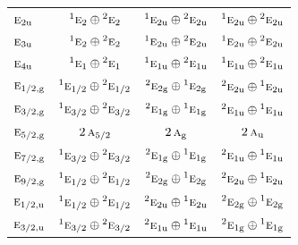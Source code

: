 \documentclass[10pt,a4paper]{article}
\numberwithin{equation}{section}
\newcommand{\irr}[1]{\text{\normalfont\scshape #1}}
\newcommand{\conjpair}[1]{{}^{#1}}
\newcommand{\ptag}[1]{\mathrm{#1}}
\begin{document}
{\begin{longtable}{@{}lccc@{}}
$\irr{e}_{2\ptag{u}}$ & $\conjpair{1}\irr{e}_{2}\oplus \conjpair{2}\irr{e}_{2}$ & $\conjpair{1}\irr{e}_{2\ptag{u}}\oplus \conjpair{2}\irr{e}_{2\ptag{u}}$ & $\conjpair{1}\irr{e}_{2\ptag{u}}\oplus \conjpair{2}\irr{e}_{2\ptag{u}}$\\
$\irr{e}_{3\ptag{u}}$ & $\conjpair{1}\irr{e}_{2}\oplus \conjpair{2}\irr{e}_{2}$ & $\conjpair{1}\irr{e}_{2\ptag{u}}\oplus \conjpair{2}\irr{e}_{2\ptag{u}}$ & $\conjpair{1}\irr{e}_{2\ptag{u}}\oplus \conjpair{2}\irr{e}_{2\ptag{u}}$\\
$\irr{e}_{4\ptag{u}}$ & $\conjpair{1}\irr{e}_{1}\oplus \conjpair{2}\irr{e}_{1}$ & $\conjpair{1}\irr{e}_{1\ptag{u}}\oplus \conjpair{2}\irr{e}_{1\ptag{u}}$ & $\conjpair{1}\irr{e}_{1\ptag{u}}\oplus \conjpair{2}\irr{e}_{1\ptag{u}}$\\
$\irr{e}_{1/2,\ptag{g}}$ & $\conjpair{1}\irr{e}_{1/2}\oplus \conjpair{2}\irr{e}_{1/2}$ & $\conjpair{2}\irr{e}_{2\ptag{g}}\oplus \conjpair{1}\irr{e}_{2\ptag{g}}$ & $\conjpair{2}\irr{e}_{2\ptag{u}}\oplus \conjpair{1}\irr{e}_{2\ptag{u}}$\\
$\irr{e}_{3/2,\ptag{g}}$ & $\conjpair{1}\irr{e}_{3/2}\oplus \conjpair{2}\irr{e}_{3/2}$ & $\conjpair{2}\irr{e}_{1\ptag{g}}\oplus \conjpair{1}\irr{e}_{1\ptag{g}}$ & $\conjpair{2}\irr{e}_{1\ptag{u}}\oplus \conjpair{1}\irr{e}_{1\ptag{u}}$\\
$\irr{e}_{5/2,\ptag{g}}$ & $2\,\irr{a}_{5/2}$ & $2\,\irr{a}_{\ptag{g}}$ & $2\,\irr{a}_{\ptag{u}}$\\
$\irr{e}_{7/2,\ptag{g}}$ & $\conjpair{1}\irr{e}_{3/2}\oplus \conjpair{2}\irr{e}_{3/2}$ & $\conjpair{2}\irr{e}_{1\ptag{g}}\oplus \conjpair{1}\irr{e}_{1\ptag{g}}$ & $\conjpair{2}\irr{e}_{1\ptag{u}}\oplus \conjpair{1}\irr{e}_{1\ptag{u}}$\\
$\irr{e}_{9/2,\ptag{g}}$ & $\conjpair{1}\irr{e}_{1/2}\oplus \conjpair{2}\irr{e}_{1/2}$ & $\conjpair{2}\irr{e}_{2\ptag{g}}\oplus \conjpair{1}\irr{e}_{2\ptag{g}}$ & $\conjpair{2}\irr{e}_{2\ptag{u}}\oplus \conjpair{1}\irr{e}_{2\ptag{u}}$\\
$\irr{e}_{1/2,\ptag{u}}$ & $\conjpair{1}\irr{e}_{1/2}\oplus \conjpair{2}\irr{e}_{1/2}$ & $\conjpair{2}\irr{e}_{2\ptag{u}}\oplus \conjpair{1}\irr{e}_{2\ptag{u}}$ & $\conjpair{2}\irr{e}_{2\ptag{g}}\oplus \conjpair{1}\irr{e}_{2\ptag{g}}$\\
$\irr{e}_{3/2,\ptag{u}}$ & $\conjpair{1}\irr{e}_{3/2}\oplus \conjpair{2}\irr{e}_{3/2}$ & $\conjpair{2}\irr{e}_{1\ptag{u}}\oplus \conjpair{1}\irr{e}_{1\ptag{u}}$ & $\conjpair{2}\irr{e}_{1\ptag{g}}\oplus \conjpair{1}\irr{e}_{1\ptag{g}}$\\

\end{longtable}}
\end{document}
